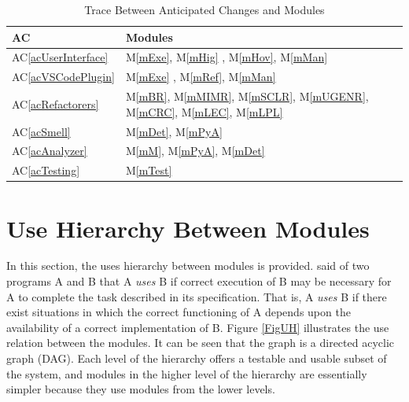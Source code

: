 \documentclass[12pt, titlepage]{article}
\newcommand{\acref}[1]{AC\ref{#1}}
\newcommand{\mref}[1]{M\ref{#1}}
\begin{document}
\begin{table}[H]
  \centering
  \begin{tabular}{p{} p{}}
  \toprule
  \textbf{AC} & \textbf{Modules}\\
  \midrule
  \acref{acUserInterface} & \mref{mExe}, \mref{mHig} , \mref{mHov}, \mref{mMan} \\ \hline
  \acref{acVSCodePlugin} & \mref{mExe} , \mref{mRef}, \mref{mMan} \\ \hline
  \acref{acRefactorers} & \mref{mBR}, \mref{mMIMR}, \mref{mSCLR}, \mref{mUGENR}, \mref{mCRC}, \mref{mLEC}, \mref{mLPL} \\ \hline
  \acref{acSmell} & \mref{mDet}, \mref{mPyA} \\ \hline
  \acref{acAnalyzer} & \mref{mM}, \mref{mPyA}, \mref{mDet} \\ \hline
  \acref{acTesting} & \mref{mTest}  \\ 
  \bottomrule
  \end{tabular}
  \caption{Trace Between Anticipated Changes and Modules}
  \label{TblACT}
\end{table}

\section{Use Hierarchy Between Modules} \label{SecUse}

In this section, the uses hierarchy between modules is
provided. \citet{Parnas1978} said of two programs A and B that A {\em uses} B if
correct execution of B may be necessary for A to complete the task described in
its specification. That is, A {\em uses} B if there exist situations in which
the correct functioning of A depends upon the availability of a correct
implementation of B.  Figure \ref{FigUH} illustrates the use relation between
the modules. It can be seen that the graph is a directed acyclic graph
(DAG). Each level of the hierarchy offers a testable and usable subset of the
system, and modules in the higher level of the hierarchy are essentially simpler
because they use modules from the lower levels.

\end{document}
